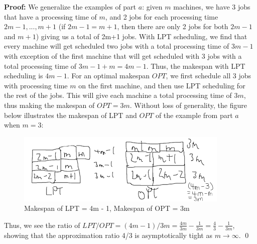 \documentclass[oneside]{homework} %
\begin{document}
\textbf{Proof:} We generalize the examples of part $a$: given $m$ machines, we have 3 jobs that have a processing time of $m$, and 2 jobs for each processing time $2m-1,...,m+1$ (if $2m-1 = m+1$, then there are only 2 jobs for both $2m-1$ and $m+1$) giving us a total of 2m+1 jobs. With LPT scheduling, we find that every machine will get scheduled two jobs with a total processing time of $3m-1$ with exception of the first machine that will get scheduled with 3 jobs with a total processing time of $3m-1+m = 4m-1$. Thus, the makespan with LPT scheduling is $4m-1$. For an optimal makespan $OPT$, we first schedule all 3 jobs with processing time $m$ on the first machine, and then use LPT scheduling for the rest of the jobs. This will give each machine a total processing time of $3m$, thus making the makespan of $OPT = 3m$. Without loss of generality, the figure below illustrates the makespan of LPT and $OPT$ of the example from part $a$ when $m = 3$:
\begin{figure}[h]
\centering
\includegraphics{2d1}
\caption{Makespan of LPT = 4m - 1, Makespan of OPT = 3m}
\end{figure}
\newline
Thus, we see the ratio of $LPT/OPT = (4m - 1) / 3m = \frac{4m}{3m} - \frac{1}{3m} = \frac{4}{3} - \frac{1}{3m}$, showing that the approximation ratio 4/3 is asymptotically tight as $m \rightarrow \infty$. \hfill\qed
\end{document}
